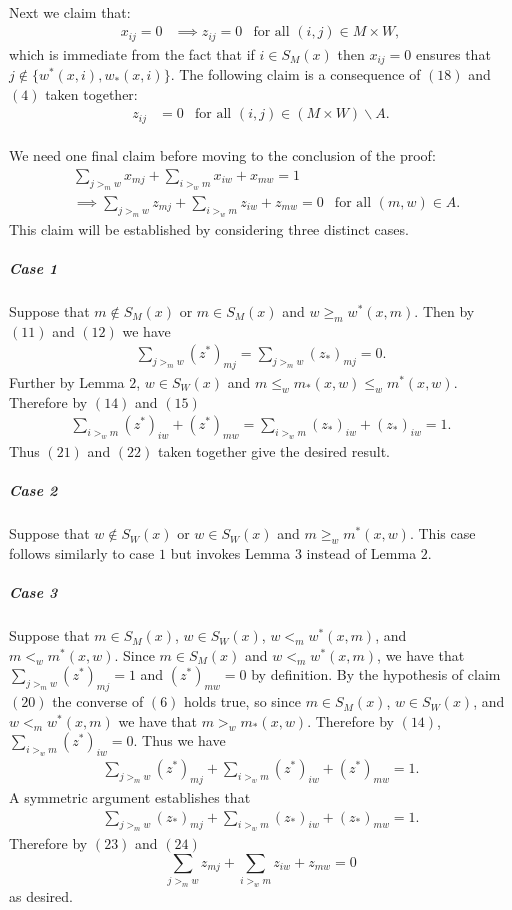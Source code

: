 \documentclass[letterpaper,12pt,oneside,onecolumn]{article}
\begin{document}
\paragraph{}
Next we claim that:
\begin{align}
x_{ij} = 0 &\implies z_{ij} = 0 &\text{for all $(i,j) \in M \times W$},
\end{align}
which is immediate from the fact that if $i \in S_M(x)$ then $x_{ij} = 0$ ensures that $j \not\in \{w^*(x,i), w_*(x,i)\}$. The following claim is a consequence of $(18)$ and $(4)$ taken together:
\begin{align}
z_{ij} &= 0 &\text{for all $(i,j) \in (M \times W) \backslash A$}.
\end{align}
\paragraph{}
We need one final claim before moving to the conclusion of the proof:
\begin{align}
&\sum_{j >_m w} x_{mj} + \sum_{i >_w m} x_{iw} + x_{mw} = 1 \nonumber\\&\implies \sum_{j >_m w} z_{mj} + \sum_{i >_w m} z_{iw} + z_{mw} = 0 &\text{for all $(m,w) \in A$}.
\end{align}
This claim will be established by considering three distinct cases.
\subparagraph{Case 1}
Suppose that $m \not\in S_M(x)$ or $m \in S_M(x)$ and $w \geq_m w^*(x,m)$. Then by $(11)$ and $(12)$ we have
\begin{align}
\sum_{j >_m w} (z^*)_{mj} = \sum_{j >_m w} (z_*)_{mj} = 0.
\end{align}
Further by Lemma $2$, $w \in S_W(x)$ and $m \leq_w m_*(x,w) \leq_w m^*(x,w)$. Therefore by $(14)$ and $(15)$
\begin{align}
\sum_{i >_w m} (z^*)_{iw} + (z^*)_{mw} = \sum_{i >_w m} (z_*)_{iw} + (z_*)_{iw} = 1.
\end{align}
Thus $(21)$ and $(22)$ taken together give the desired result.
\subparagraph{Case 2}
Suppose that $w \not\in S_W(x)$ or $w \in S_W(x)$ and $m \geq_w m^*(x,w)$. This case follows similarly to case $1$ but invokes Lemma $3$ instead of Lemma $2$.
\subparagraph{Case 3}
Suppose that $m \in S_M(x)$, $w \in S_W(x)$, $w <_m w^*(x,m)$, and $m <_w m^*(x,w)$. Since $m \in S_M(x)$ and $w <_m w^*(x,m)$, we have that $\sum_{j >_m w} (z^*)_{mj} = 1$ and $(z^*)_{mw} = 0$ by definition. By the hypothesis of claim $(20)$ the converse of $(6)$ holds true, so since $m \in S_M(x)$, $w \in S_W(x)$, and $w <_m w^*(x,m)$ we have that $m >_w m_*(x,w)$. Therefore by $(14)$, $\sum_{i >_w m} (z^*)_{iw} = 0$. Thus we have
\begin{align}
\sum_{j >_m w} (z^*)_{mj} + \sum_{i >_w m} (z^*)_{iw} + (z^*)_{mw}  = 1.
\end{align}
A symmetric argument establishes that
\begin{align}
\sum_{j >_m w} (z_*)_{mj} + \sum_{i >_w m} (z_*)_{iw} + (z_*)_{mw}  = 1.
\end{align}
Therefore by $(23)$ and $(24)$
$$\sum_{j >_m w} z_{mj} + \sum_{i >_w m} z_{iw} + z_{mw}  = 0$$
as desired.
\end{document}
